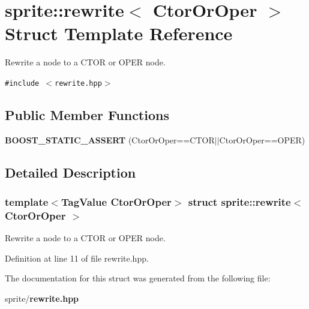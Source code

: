 \section{sprite::rewrite$<$ Ctor\-Or\-Oper $>$ Struct Template Reference}
\label{structsprite_1_1rewrite}
Rewrite a node to a CTOR or OPER node.  


{\tt \#include $<$rewrite.hpp$>$}

\subsection*{Public Member Functions}
\begin{CompactItemize}
\item 
{\bf BOOST\_\-STATIC\_\-ASSERT} (Ctor\-Or\-Oper==CTOR$|$$|$Ctor\-Or\-Oper==OPER)\label{structsprite_1_1rewrite_a1}

\end{CompactItemize}


\subsection{Detailed Description}
\subsubsection*{template$<$Tag\-Value Ctor\-Or\-Oper$>$ struct sprite::rewrite$<$ Ctor\-Or\-Oper $>$}

Rewrite a node to a CTOR or OPER node. 



Definition at line 11 of file rewrite.hpp.

The documentation for this struct was generated from the following file:\begin{CompactItemize}
\item 
sprite/{\bf rewrite.hpp}\end{CompactItemize}
